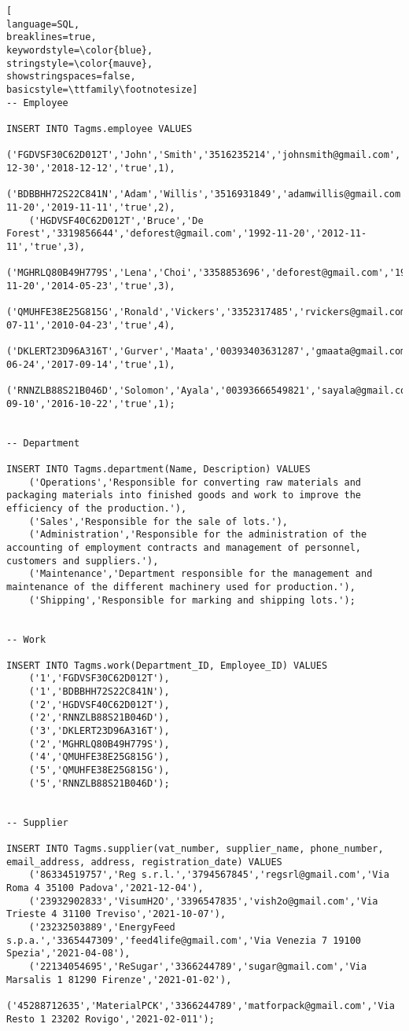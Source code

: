 \begin{lstlisting}[
language=SQL,
breaklines=true,
keywordstyle=\color{blue},
stringstyle=\color{mauve},
showstringspaces=false,
basicstyle=\ttfamily\footnotesize]
-- Employee

INSERT INTO Tagms.employee VALUES
    ('FGDVSF30C62D012T','John','Smith','3516235214','johnsmith@gmail.com','1995-12-30','2018-12-12','true',1),
    ('BDBBHH72S22C841N','Adam','Willis','3516931849','adamwillis@gmail.com','1993-11-20','2019-11-11','true',2),
    ('HGDVSF40C62D012T','Bruce','De Forest','3319856644','deforest@gmail.com','1992-11-20','2012-11-11','true',3),
    ('MGHRLQ80B49H779S','Lena','Choi','3358853696','deforest@gmail.com','1992-11-20','2014-05-23','true',3),
    ('QMUHFE38E25G815G','Ronald','Vickers','3352317485','rvickers@gmail.com','1998-07-11','2010-04-23','true',4),
    ('DKLERT23D96A316T','Gurver','Maata','00393403631287','gmaata@gmail.com','1953-06-24','2017-09-14','true',1),
    ('RNNZLB88S21B046D','Solomon','Ayala','00393666549821','sayala@gmail.com','1952-09-10','2016-10-22','true',1);


-- Department

INSERT INTO Tagms.department(Name, Description) VALUES
    ('Operations','Responsible for converting raw materials and packaging materials into finished goods and work to improve the efficiency of the production.'),
    ('Sales','Responsible for the sale of lots.'),
    ('Administration','Responsible for the administration of the accounting of employment contracts and management of personnel, customers and suppliers.'),
    ('Maintenance','Department responsible for the management and maintenance of the different machinery used for production.'),
    ('Shipping','Responsible for marking and shipping lots.');


-- Work

INSERT INTO Tagms.work(Department_ID, Employee_ID) VALUES
    ('1','FGDVSF30C62D012T'),
    ('1','BDBBHH72S22C841N'),
    ('2','HGDVSF40C62D012T'),
    ('2','RNNZLB88S21B046D'),
    ('3','DKLERT23D96A316T'),
    ('2','MGHRLQ80B49H779S'),
    ('4','QMUHFE38E25G815G'),
    ('5','QMUHFE38E25G815G'),
    ('5','RNNZLB88S21B046D');


-- Supplier

INSERT INTO Tagms.supplier(vat_number, supplier_name, phone_number, email_address, address, registration_date) VALUES
    ('86334519757','Reg s.r.l.','3794567845','regsrl@gmail.com','Via Roma 4 35100 Padova','2021-12-04'),
    ('23932902833','VisumH2O','3396547835','vish2o@gmail.com','Via Trieste 4 31100 Treviso','2021-10-07'),
    ('23232503889','EnergyFeed s.p.a.','3365447309','feed4life@gmail.com','Via Venezia 7 19100 Spezia','2021-04-08'),
    ('22134054695','ReSugar','3366244789','sugar@gmail.com','Via Marsalis 1 81290 Firenze','2021-01-02'),
    ('45288712635','MaterialPCK','3366244789','matforpack@gmail.com','Via Resto 1 23202 Rovigo','2021-02-011');



\end{lstlisting}
